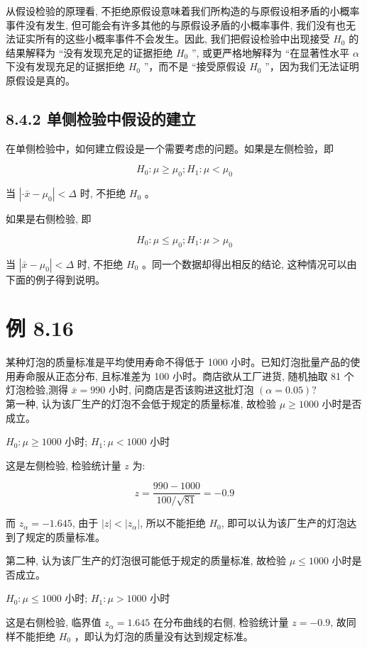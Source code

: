 \documentclass[10pt]{article}
\begin{document}
\begin{CJK*}{UTF8}{bsmi}
从假设检验的原理看, 不拒绝原假设意味着我们所构造的与原假设相矛盾的小概率事件没有发生, 但可能会有许多其他的与原假设矛盾的小概率事件, 我们没有也无法证实所有的这些小概率事件不会发生。因此, 我们把假设检验中出现接受 $H_{0}$ 的结果解释为 “没有发现充足的证据拒绝 $H_{0}$ ”, 或更严格地解释为 “在显著性水平 $\alpha$ 下没有发现充足的证据拒绝 $H_{0}$ ”，而不是 “接受原假设 $H_{0}$ ”，因为我们无法证明原假设是真的。

\subsection*{8.4.2 单侧检验中假设的建立}
在单侧检验中，如何建立假设是一个需要考虑的问题。如果是左侧检验，即

$$
H_{0}: \mu \geqslant \mu_{0} ; H_{1}: \mu<\mu_{0}
$$

当 $\left|\cdot \bar{x}-\mu_{0}\right|<\Delta$ 时, 不拒绝 $H_{0}$ 。

如果是右侧检验, 即

$$
H_{0}: \mu \leqslant \mu_{0} ; H_{1}: \mu>\mu_{0}
$$

当 $\left|\bar{x}-\mu_{0}\right|<\Delta$ 时, 不拒绝 $H_{0}$ 。同一个数据却得出相反的结论, 这种情况可以由下面的例子得到说明。

\section*{例 8.16}
某种灯泡的质量标准是平均使用寿命不得低于 1000 小时。已知灯泡批量产品的使用寿命服从正态分布, 且标准差为 100 小时。商店欲从工厂进货, 随机抽取 81 个灯泡检验,测得 $\bar{x}=990$ 小时, 问商店是否该购进这批灯泡 $(\alpha=0.05) ?$\\
第一种, 认为该厂生产的灯泡不会低于规定的质量标准, 故检验 $\mu \geqslant 1000$ 小时是否成立。

$H_{0}: \mu \geqslant 1000$ 小时; $H_{1}: \mu<1000$ 小时

这是左侧检验, 检验统计量 $z$ 为:

$$
z=\frac{990-1000}{100 / \sqrt{81}}=-0.9
$$

而 $z_{\alpha}=-1.645$, 由于 $|z|<\left|z_{\alpha}\right|$, 所以不能拒绝 $H_{0}$, 即可以认为该厂生产的灯泡达到了规定的质量标准。

第二种, 认为该厂生产的灯泡很可能低于规定的质量标准, 故检验 $\mu \leqslant 1000$ 小时是否成立。

$H_{0}: \mu \leqslant 1000$ 小时; $H_{1}: \mu>1000$ 小时

这是右侧检验, 临界值 $z_{\alpha}=1.645$ 在分布曲线的右侧, 检验统计量 $z=-0.9$, 故同样不能拒绝 $H_{0}$ ，即认为灯泡的质量没有达到规定标准。


\end{CJK*}
\end{document}
